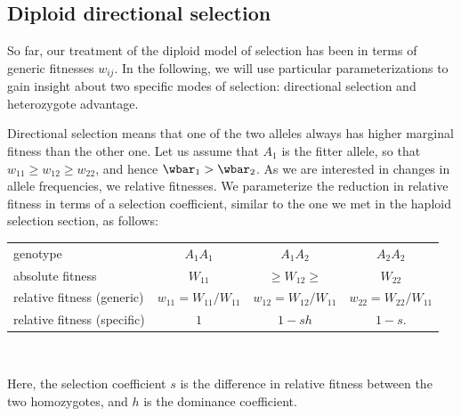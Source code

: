 \subsection{Diploid directional selection}
So far, our treatment of the diploid model of selection has been in terms of generic fitnesses $w_{ij}$. In the following, we will use particular parameterizations to gain insight about two specific modes of selection: directional selection and heterozygote advantage.

Directional selection means that one of the two alleles always has higher marginal fitness than the other one. Let us assume that $A_1$ is the fitter allele, so that $w_{11} \geq w_{12} \geq w_{22}$, and hence $\wbar_1 > \wbar_2$. As we are interested in changes in allele frequencies, we  relative fitnesses. We parameterize the reduction in relative fitness in terms of a selection coefficient, similar to the
one we met in the haploid selection section, as follows:\\
\begin{center}
\begin{tabular}{lccc}
genotype & $A_1A_1$ & $A_1A_2$ & $A_2A_2$ \\
absolute fitness & $W_{11}$ & $ \geq W_{12} \geq$ & $W_{22}$ \\
relative fitness (generic) & $w_{11} = W_{11}/W_{11}$ & $w_{12} = W_{12}/W_{11}$ & $w_{22} = W_{22}/W_{11}$ \\
relative fitness  (specific) & $1$ & $1-sh$ & $1-s$. \\
\end{tabular}\\
\end{center}
Here, the selection coefficient $s$ is the difference in relative
fitness between the two homozygotes, and $h$ is the
dominance coefficient. \\

